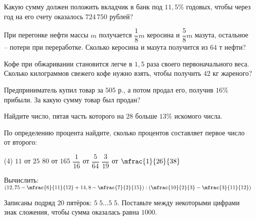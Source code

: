 	\begin{homework}[number=2]
		\begin{listofex}
		\item Какую сумму должен положить вкладчик в банк под \( 11,5\% \) годовых, чтобы через год на его счету оказалось \( 724\,750 \) рублей?
		\item При перегонке нефти массы \( m \) получается \( \dfrac{1}{8}m \) керосина и \( \dfrac{5}{8}m \) мазута, остальное – потери при переработке. Сколько керосина и мазута получится из \(64\) т нефти?
		\item Кофе при обжаривании становится легче в \(1,5\) раза своего первоначального веса. Сколько килограммов свежего кофе нужно взять, чтобы получить \(42\) кг жареного?
		\item Предприниматель купил товар за \(505\) р., а потом продал его, получив \(16 \%\) прибыли. За какую сумму товар был продан?
		\item Найдите число, пятая часть которого на \( 28 \) больше \( 13\% \) искомого числа.
		\item По определению процента найдите, сколько процентов составляет первое число от второго:
		\begin{tasks}(4)
			\task \( 11 \) от \( 25 \)
			\task \( 80 \) от \( 165 \)
			\task \( \dfrac{1}{16} \) от \( \dfrac{5}{64} \)
			\task \( \dfrac{3}{19} \) от \( \mfrac{1}{26}{38} \)
		\end{tasks}
		\item Вычислить:\quad\( \left( 12,75 - \mfrac{6}{11}{12} + 14,8 - \mfrac{7}{2}{15}\right): \left( \mfrac{10}{2}{3} - \mfrac{3}{11}{12} \right) \)
		\item Записаны подряд \( 20 \) пятёрок: \( 5\;5\dots5\;5 \). Поставьте между некоторыми цифрами знак сложения, чтобы сумма оказалась равна \( 1000 \).
	\end{listofex}
\end{homework}

